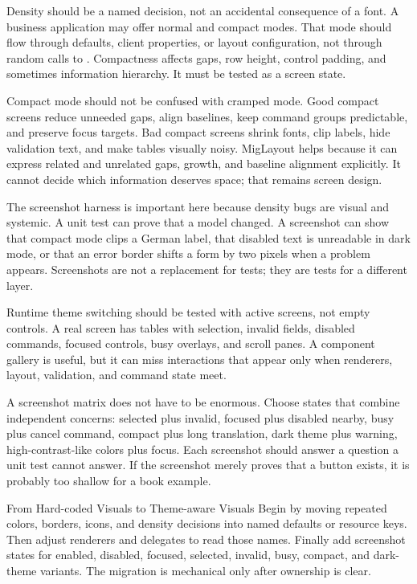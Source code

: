 Density should be a named decision, not an accidental consequence of a font. A business application may offer normal and compact modes. That mode should flow through defaults, client properties, or layout configuration, not through random calls to . Compactness affects gaps, row height, control padding, and sometimes information hierarchy. It must be tested as a screen state.

Compact mode should not be confused with cramped mode. Good compact screens reduce unneeded gaps, align baselines, keep command groups predictable, and preserve focus targets. Bad compact screens shrink fonts, clip labels, hide validation text, and make tables visually noisy. MigLayout helps because it can express related and unrelated gaps, growth, and baseline alignment explicitly. It cannot decide which information deserves space; that remains screen design.

The screenshot harness is important here because density bugs are visual and systemic. A unit test can prove that a model changed. A screenshot can show that compact mode clips a German label, that disabled text is unreadable in dark mode, or that an error border shifts a form by two pixels when a problem appears. Screenshots are not a replacement for tests; they are tests for a different layer.

Runtime theme switching should be tested with active screens, not empty controls. A real screen has tables with selection, invalid fields, disabled commands, focused controls, busy overlays, and scroll panes. A component gallery is useful, but it can miss interactions that appear only when renderers, layout, validation, and command state meet.

A screenshot matrix does not have to be enormous. Choose states that combine independent concerns: selected plus invalid, focused plus disabled nearby, busy plus cancel command, compact plus long translation, dark theme plus warning, high-contrast-like colors plus focus. Each screenshot should answer a question a unit test cannot answer. If the screenshot merely proves that a button exists, it is probably too shallow for a book example.

\begin{migrationbox}{From Hard-coded Visuals to Theme-aware Visuals}
Begin by moving repeated colors, borders, icons, and density decisions into named defaults or resource keys. Then adjust renderers and delegates to read those names. Finally add screenshot states for enabled, disabled, focused, selected, invalid, busy, compact, and dark-theme variants. The migration is mechanical only after ownership is clear.
\end{migrationbox}

